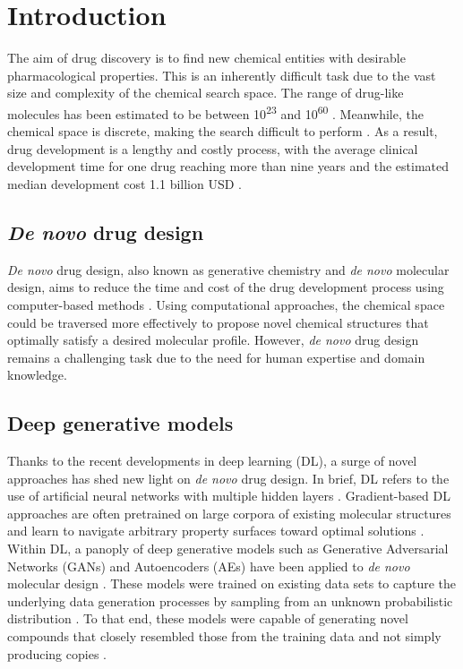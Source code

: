 \chapter{Introduction}
The aim of drug discovery is to find new chemical entities with desirable pharmacological properties. This is an inherently difficult task due to the vast size and complexity of the chemical search space. The range of drug-like molecules has been estimated to be between 10\textsuperscript{23} and 10\textsuperscript{60} \cite{polishchuk2013estimation}. Meanwhile, the chemical space is discrete, making the search difficult to perform \cite{kirkpatrick2004chemical}. As a result, drug development is a lengthy and costly process, with the average clinical development time for one drug reaching more than nine years and the estimated median development cost 1.1 billion USD \cite{wouters2020estimated}.

\section{\textit{De novo} drug design}
\textit{De novo} drug design, also known as generative chemistry and \textit{de novo} molecular design, aims to reduce the time and cost of the drug development process using computer-based methods \cite{meyers2021novo}. Using computational approaches, the chemical space could be traversed more effectively to propose novel chemical structures that optimally satisfy a desired molecular profile. However, \textit{de novo} drug design remains a challenging task due to the need for human expertise and domain knowledge.

\section{Deep generative models}
Thanks to the recent developments in deep learning (DL), a surge of novel approaches has shed new light on \textit{de novo} drug design. In brief, DL refers to the use of artificial neural networks with multiple hidden layers \cite{lecun2015deep}. Gradient-based DL approaches are often pretrained on large corpora of existing molecular structures and learn to navigate arbitrary property surfaces toward optimal solutions \cite{meyers2021novo}. Within DL, a panoply of deep generative models such as Generative Adversarial Networks (GANs) and Autoencoders (AEs) have been applied to \textit{de novo} molecular design \cite{kadurin2017drugan}. These models were trained on existing data sets to capture the underlying data generation processes by sampling from an unknown probabilistic distribution \cite{sousa2021generative}. To that end, these models were capable of generating novel compounds that closely resembled those from the training data and not simply producing copies \cite{foster2019generative}. 

